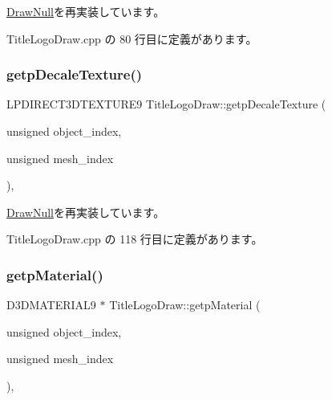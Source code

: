 \mbox{\hyperlink{class_draw_null_a7586cc78eed6bcaf2972ad7a6a70e665}{Draw\+Null}}を再実装しています。



 Title\+Logo\+Draw.\+cpp の 80 行目に定義があります。

\mbox{\label{class_title_logo_draw_a15ca49711182673a20439200dd8bc119}} 
\subsubsection{\texorpdfstring{getp\+Decale\+Texture()}{getpDecaleTexture()}}
{\footnotesize\ttfamily L\+P\+D\+I\+R\+E\+C\+T3\+D\+T\+E\+X\+T\+U\+R\+E9 Title\+Logo\+Draw\+::getp\+Decale\+Texture (\begin{DoxyParamCaption}\item[{unsigned}]{object\+\_\+index,  }\item[{unsigned}]{mesh\+\_\+index }\end{DoxyParamCaption})\hspace{0.3cm}{\ttfamily [override]}, {\ttfamily [virtual]}}



\mbox{\hyperlink{class_draw_null_a2dfa2d2cbb66249f933420a38e9cadad}{Draw\+Null}}を再実装しています。



 Title\+Logo\+Draw.\+cpp の 118 行目に定義があります。

\mbox{\label{class_title_logo_draw_aafb35175c0ffe60c7a3facf7f9cda2f2}} 
\subsubsection{\texorpdfstring{getp\+Material()}{getpMaterial()}}
{\footnotesize\ttfamily D3\+D\+M\+A\+T\+E\+R\+I\+A\+L9 $\ast$ Title\+Logo\+Draw\+::getp\+Material (\begin{DoxyParamCaption}\item[{unsigned}]{object\+\_\+index,  }\item[{unsigned}]{mesh\+\_\+index }\end{DoxyParamCaption})\hspace{0.3cm}{\ttfamily [override]}, {\ttfamily [virtual]}}




